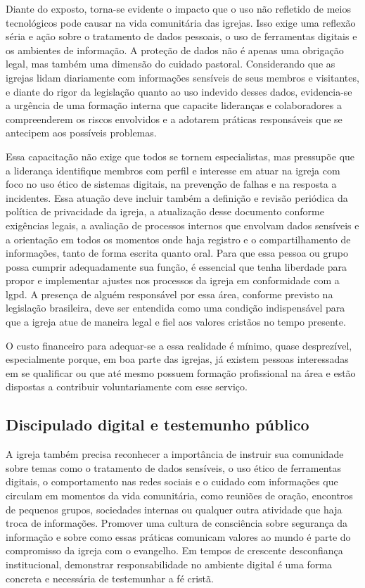 Diante do exposto, torna-se evidente o impacto que o uso não refletido de meios tecnológicos pode causar na vida comunitária das igrejas. Isso exige uma reflexão séria e ação sobre o tratamento de dados pessoais, o uso de ferramentas digitais e os ambientes de informação. A proteção de dados não é apenas uma obrigação legal, mas também uma dimensão do cuidado pastoral. Considerando que as igrejas lidam diariamente com informações sensíveis de seus membros e visitantes, e diante do rigor da legislação quanto ao uso indevido desses dados, evidencia-se a urgência de uma formação interna que capacite lideranças e colaboradores a compreenderem os riscos envolvidos e a adotarem práticas responsáveis que se antecipem aos possíveis problemas.

Essa capacitação não exige que todos se tornem especialistas, mas pressupõe que a liderança identifique membros com perfil e interesse em atuar na igreja com foco no uso ético de sistemas digitais, na prevenção de falhas e na resposta a incidentes. Essa atuação deve incluir também a definição e revisão periódica da política de privacidade da igreja, a atualização desse documento conforme exigências legais, a avaliação de processos internos que envolvam dados sensíveis e a orientação em todos os momentos onde haja registro e o compartilhamento de informações, tanto de forma escrita quanto oral. Para que essa pessoa ou grupo possa cumprir adequadamente sua função, é essencial que tenha liberdade para propor e implementar ajustes nos processos da igreja em conformidade com a \gls{lgpd}. A presença de alguém responsável por essa área, conforme previsto na legislação brasileira, deve ser entendida como uma condição indispensável para que a igreja atue de maneira legal e fiel aos valores cristãos no tempo presente.

O custo financeiro para adequar-se a essa realidade é mínimo, quase desprezível, especialmente porque, em boa parte das igrejas, já existem pessoas interessadas em se qualificar ou que até mesmo possuem formação profissional na área e estão dispostas a contribuir voluntariamente com esse serviço.

\subsection{Discipulado digital e testemunho público}

A igreja também precisa reconhecer a importância de instruir sua comunidade sobre temas como o tratamento de dados sensíveis, o uso ético de ferramentas digitais, o comportamento nas redes sociais e o cuidado com informações que circulam em momentos da vida comunitária, como reuniões de oração, encontros de pequenos grupos, sociedades internas ou qualquer outra atividade que haja troca de informações. Promover uma cultura de consciência sobre segurança da informação e sobre como essas práticas comunicam valores ao mundo é parte do compromisso da igreja com o evangelho. Em tempos de crescente desconfiança institucional, demonstrar responsabilidade no ambiente digital é uma forma concreta e necessária de testemunhar a fé cristã.

